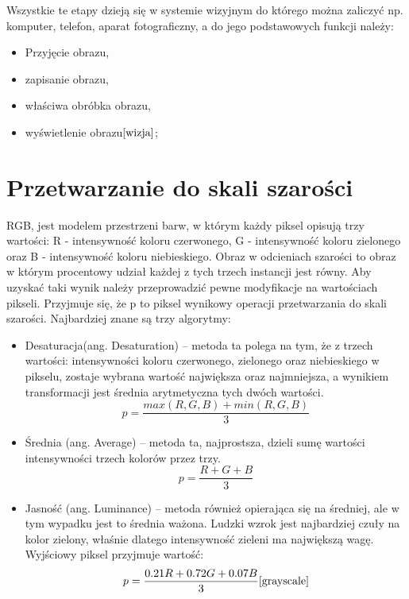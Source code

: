 \documentclass[eng,oneside]{mgr}
\begin{document}
Wszystkie te etapy dzieją się w systemie wizyjnym do którego można zaliczyć np. komputer, telefon, aparat fotograficzny, a do jego podstawowych funkcji należy:
\begin{itemize}
\item Przyjęcie obrazu,
\item zapisanie obrazu,
\item właściwa obróbka obrazu,
\item wyświetlenie obrazu$\cite{wizja}$;
\end{itemize}

\section{Przetwarzanie do skali szarości}
RGB, jest modelem przestrzeni barw, w którym każdy piksel opisują trzy wartości: R - intensywność koloru czerwonego, G - intensywność koloru zielonego oraz B - intensywność koloru niebieskiego. Obraz w odcieniach szarości to obraz w którym procentowy udział każdej z tych trzech instancji jest równy. Aby uzyskać taki wynik należy przeprowadzić pewne modyfikacje na wartościach pikseli. Przyjmuje się, że p to piksel wynikowy operacji przetwarzania do skali szarości. Najbardziej znane są trzy algorytmy:
\begin{itemize}
\item Desaturacja(ang. Desaturation) – metoda ta polega na tym, że z trzech wartości: intensywności koloru czerwonego, zielonego oraz niebieskiego w pikselu, zostaje wybrana wartość największa oraz najmniejsza, a wynikiem transformacji jest średnia arytmetyczna tych dwóch wartości.
\\
\begin{equation}
p=\frac{max(R,G,B) + min(R,G,B)}{3}
\end{equation}
\item Średnia (ang. Average) – metoda ta, najprostsza, dzieli sumę wartości intensywności trzech kolorów przez trzy.
\\
\begin{equation}
p=\frac{R + G + B}{3}
\end{equation}
\item Jasność (ang. Luminance) – metoda również opierająca się na średniej, ale w tym wypadku jest to średnia ważona. Ludzki wzrok jest najbardziej czuły na kolor zielony, właśnie dlatego intensywność zieleni ma największą wagę. Wyjściowy piksel przyjmuje wartość:
\\
\begin{equation}
p=\frac{0.21R + 0.72G + 0.07B}{3}\cite{grayscale}
\end{equation}

\end{itemize}
\end{document}
